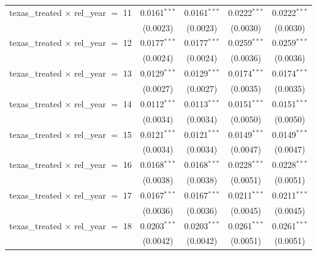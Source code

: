 \begin{tabular}{lcccc}
   texas\_treated $\times$ rel\_year $=$ 11     & 0.0161$^{***}$ & 0.0161$^{***}$        & 0.0222$^{***}$  & 0.0222$^{***}$\\   
                                                & (0.0023)       & (0.0023)              & (0.0030)        & (0.0030)\\   
   texas\_treated $\times$ rel\_year $=$ 12     & 0.0177$^{***}$ & 0.0177$^{***}$        & 0.0259$^{***}$  & 0.0259$^{***}$\\   
                                                & (0.0024)       & (0.0024)              & (0.0036)        & (0.0036)\\   
   texas\_treated $\times$ rel\_year $=$ 13     & 0.0129$^{***}$ & 0.0129$^{***}$        & 0.0174$^{***}$  & 0.0174$^{***}$\\   
                                                & (0.0027)       & (0.0027)              & (0.0035)        & (0.0035)\\   
   texas\_treated $\times$ rel\_year $=$ 14     & 0.0112$^{***}$ & 0.0113$^{***}$        & 0.0151$^{***}$  & 0.0151$^{***}$\\   
                                                & (0.0034)       & (0.0034)              & (0.0050)        & (0.0050)\\   
   texas\_treated $\times$ rel\_year $=$ 15     & 0.0121$^{***}$ & 0.0121$^{***}$        & 0.0149$^{***}$  & 0.0149$^{***}$\\   
                                                & (0.0034)       & (0.0034)              & (0.0047)        & (0.0047)\\   
   texas\_treated $\times$ rel\_year $=$ 16     & 0.0168$^{***}$ & 0.0168$^{***}$        & 0.0228$^{***}$  & 0.0228$^{***}$\\   
                                                & (0.0038)       & (0.0038)              & (0.0051)        & (0.0051)\\   
   texas\_treated $\times$ rel\_year $=$ 17     & 0.0167$^{***}$ & 0.0167$^{***}$        & 0.0211$^{***}$  & 0.0211$^{***}$\\   
                                                & (0.0036)       & (0.0036)              & (0.0045)        & (0.0045)\\   
   texas\_treated $\times$ rel\_year $=$ 18     & 0.0203$^{***}$ & 0.0203$^{***}$        & 0.0261$^{***}$  & 0.0261$^{***}$\\   
                                                & (0.0042)       & (0.0042)              & (0.0051)        & (0.0051)\\   

\end{tabular}
